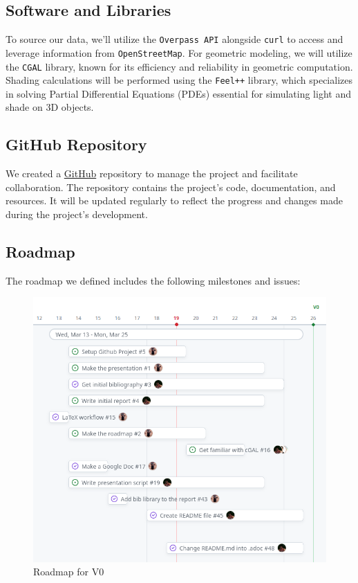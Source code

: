 \documentclass[12pt]{article}
\begin{document}
\subsection{Software and Libraries}
To source our data, we'll utilize the \texttt{Overpass API} \cite{overpass} alongside
\texttt{curl} \cite{curl} to access and leverage information from \texttt{OpenStreetMap}.
For geometric modeling, we will utilize the \texttt{CGAL} library, known for its efficiency and
reliability in geometric computation\cite{cgal}. Shading calculations will be performed using the
\texttt{Feel++} \cite{feel++} library, which specializes in solving Partial Differential Equations (PDEs)
essential for simulating light and shade on 3D objects.

\subsection{GitHub Repository}
We created a \href{https://github.com/master-csmi/2024-m1-vegetation}{GitHub} repository to manage the project and facilitate collaboration.
The repository contains the project's code, documentation, and resources. It will be
updated regularly to reflect the progress and changes made during the project's
development.

\subsection{Roadmap}
The roadmap we defined includes the following milestones and issues:

\begin{figure}[H]
    \centering
    \includegraphics[width=1\textwidth]{images/roadmap_v0.png}
    \caption{Roadmap for V0}
\end{figure}
\end{document}
